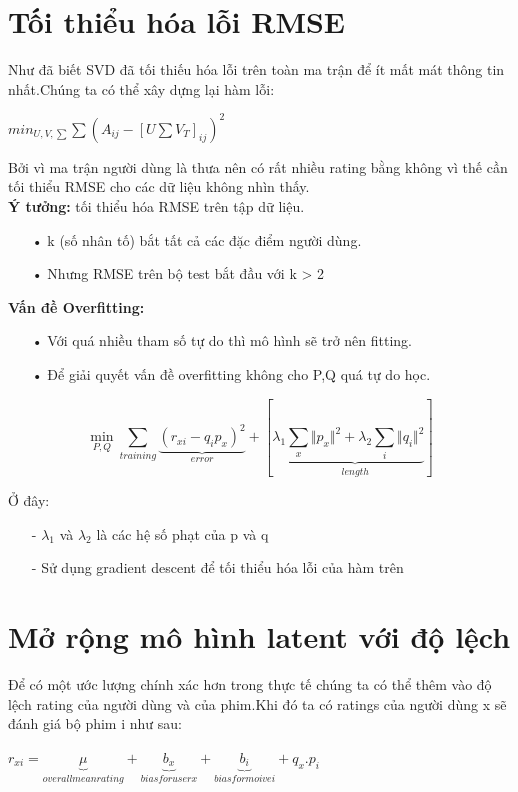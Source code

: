 \documentclass[a4paper,11pt]{report}
\begin{document}
\section{Tối thiểu hóa lỗi RMSE}
Như đã biết SVD đã tối thiếu hóa lỗi trên toàn ma trận để ít mất mát thông tin nhất.Chúng ta có thể xây dựng lại hàm lỗi:
\begin{center}
\LARGE{
$min_{U,V,\sum}\sum(A_{ij} - [U \sum V_{T}]_{ij})^2$
}
\end{center}
Bởi vì ma trận người dùng là thưa nên có rất nhiều rating bằng không vì thế cần tối thiểu RMSE cho các dữ liệu không nhìn thấy. \\ 
\textbf{Ý tưởng:} tối thiểu hóa RMSE trên tập dữ liệu.
\begin{itemize}
\item[•] k (số nhân tố) bắt tất cả các đặc điểm người dùng.
\item[•] Nhưng RMSE trên bộ test bắt đầu với k > 2
\end{itemize}
\textbf{Vấn đề Overfitting:}
\begin{itemize}
\item[•] Với quá nhiều tham số tự do thì mô hình sẽ trở nên fitting.
\item[•] Để giải quyết vấn đề overfitting không cho P,Q quá tự do học.
\end{itemize}
\begin{center}
\begin{displaymath}
\displaystyle\min_{P,Q} \sum_{training}\underbrace{(r_{xi} - q_ip_x)^2}_{error} + [\lambda_1\underbrace{\sum_{x}\Vert p_x \Vert^{2} + \lambda_2\sum_i\Vert q_i \Vert^2}_{length}]
\end{displaymath}
\end{center}
Ở đây:
\begin{itemize}
\item[-] $\lambda_1$ và $ \lambda_2$ là các hệ số phạt của p và q
\item[-] Sử dụng gradient descent để tối thiểu hóa lỗi của hàm trên
\end{itemize}
\section{Mở rộng mô hình latent với độ lệch}
Để có một ước lượng chính xác hơn trong thực tế chúng ta có thể thêm vào độ lệch rating của người dùng và của phim.Khi đó ta có ratings của người dùng x sẽ đánh giá bộ phim i như sau:
\begin{center}
$r_{xi} = \underbrace{\mu}_{overall mean rating} + \underbrace{b_{x}}_{bias for user x} + \underbrace{b_{i}}_{bias for moive i} + q_{x}.p_i$
\end{center}
\end{document}
